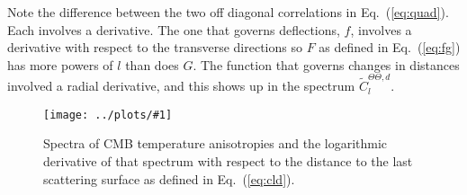 \documentclass[prd,amsmath,amssymb,floatfix,superscriptaddress,nofootinbib,twocolumn]{revtex4-1}
\def\be{\begin{equation}}
\def\ee{\end{equation}}
\def\bea{\begin{eqnarray}}
\def\eea{\end{eqnarray}}
\newcommand{\vs}{\nonumber\\}
\newcommand{\ec}[1]{Eq.~(\ref{eq:#1})}
\newcommand{\eql}[1]{\label{eq:#1}}
\newcommand{\sfig}[2]{
\texttt{[image: ../plots/\#1]}
        }
\newcommand{\Sfig}[2]{
   \begin{figure}[thbp]
   \begin{center}
    \sfig{#1.pdf}{\columnwidth}
    \caption{{\small #2}}
    \label{fig:#1}
     \end{center}
   \end{figure}
}
\begin{document}

Note the difference between the two off diagonal correlations in \ec{quad}. Each involves a derivative. The one that governs deflections, $f$, %
involves a derivative with respect to the transverse directions so $F$ as defined in \ec{fg} has more powers of $l$ than does $G$.  
The function that governs changes in distances involved a radial derivative, and this shows up in the spectrum $\tilde{C}^{\Theta\Theta,d}_{l}$.

\Sfig{TT1}{Spectra of CMB temperature anisotropies and the logarithmic derivative of that spectrum with respect to the distance to the last scattering surface as defined in \ec{cld}.}
\end{document}
